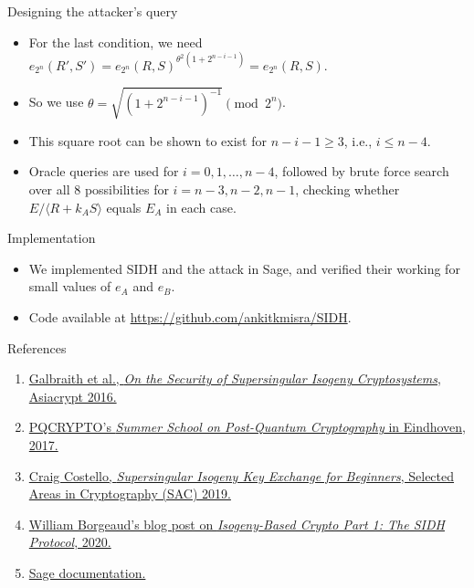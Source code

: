 \documentclass{beamer}
\begin{document}
\begin{frame}{Designing the attacker's query}
    \begin{itemize}
        \item For the last condition, we need $e_{2^n}(R',S') = e_{2^n}(R,S)^{\theta^2(1+2^{n-i-1})} = e_{2^n}(R,S)$.
        \item So we use $\theta = \sqrt{(1+2^{n-i-1})^{-1}}\pmod{2^n}$.
        \item This square root can be shown to exist for $n-i-1\geq 3$, i.e., $i\leq n-4$.
        \item Oracle queries are used for $i = 0,1,\dots,n-4$, followed by brute force search over all 8 possibilities for $i=n-3,n-2,n-1$, checking whether $E/\langle R+k_A S\rangle$ equals $E_A$ in each case.
    \end{itemize}
\end{frame}

\begin{frame}{Implementation}
    \begin{itemize}
        \item We implemented SIDH and the attack in Sage, and verified their working for small values of $e_A$ and $e_B$.
        \item Code available at \url{https://github.com/ankitkmisra/SIDH}.
    \end{itemize}
\end{frame}

\begin{frame}{References}
    \begin{enumerate}
        \item \href{https://eprint.iacr.org/2016/859.pdf}{Galbraith et al., \textit{On the Security of Supersingular Isogeny Cryptosystems}, Asiacrypt 2016.}
        \item \href{https://2017.pqcrypto.org/school/slides/Isogeny_based_crypto.pdf}{PQCRYPTO's \textit{Summer School on Post-Quantum Cryptography} in Eindhoven, 2017.}
        \item \href{https://eprint.iacr.org/2019/1321.pdf}{Craig Costello, \textit{Supersingular Isogeny Key Exchange for Beginners}, Selected Areas in Cryptography (SAC) 2019.}
        \item \href{https://solvable.group/posts/isobeg/}{William Borgeaud's blog post on \textit{Isogeny-Based Crypto Part 1: The SIDH Protocol}, 2020.}
        \item \href{https://doc.sagemath.org/html/en/}{Sage documentation.}
    \end{enumerate}
\end{frame}
\end{document}
